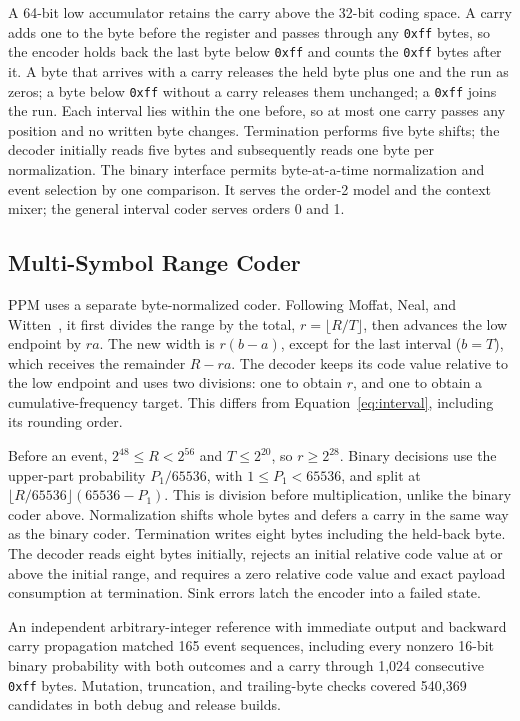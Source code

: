 \documentclass[10pt,letterpaper]{article}
\newcommand{\code}[1]{\texttt{#1}}
\begin{document}
A 64-bit low accumulator retains the carry above the 32-bit coding space. A carry adds one to the byte before the register and passes through any \code{0xff} bytes, so the encoder holds back the last byte below \code{0xff} and counts the \code{0xff} bytes after it. A byte that arrives with a carry releases the held byte plus one and the run as zeros; a byte below \code{0xff} without a carry releases them unchanged; a \code{0xff} joins the run. Each interval lies within the one before, so at most one carry passes any position and no written byte changes. Termination performs five byte shifts; the decoder initially reads five bytes and subsequently reads one byte per normalization. The binary interface permits byte-at-a-time normalization and event selection by one comparison. It serves the order-2 model and the context mixer; the general interval coder serves orders 0 and 1.

\subsection{Multi-Symbol Range Coder}
PPM uses a separate byte-normalized coder. Following Moffat, Neal, and Witten~\cite[Sec.~4.4]{moffat}, it first divides the range by the total, $r=\lfloor R/T\rfloor$, then advances the low endpoint by $ra$. The new width is $r(b-a)$, except for the last interval ($b=T$), which receives the remainder $R-ra$. The decoder keeps its code value relative to the low endpoint and uses two divisions: one to obtain $r$, and one to obtain a cumulative-frequency target. This differs from Equation~\eqref{eq:interval}, including its rounding order.

Before an event, $2^{48}\leq R<2^{56}$ and $T\leq2^{20}$, so $r\geq2^{28}$. Binary decisions use the upper-part probability $P_1/65536$, with $1\leq P_1<65536$, and split at $\lfloor R/65536\rfloor(65536-P_1)$. This is division before multiplication, unlike the binary coder above. Normalization shifts whole bytes and defers a carry in the same way as the binary coder. Termination writes eight bytes including the held-back byte. The decoder reads eight bytes initially, rejects an initial relative code value at or above the initial range, and requires a zero relative code value and exact payload consumption at termination. Sink errors latch the encoder into a failed state.

An independent arbitrary-integer reference with immediate output and backward carry propagation matched 165 event sequences, including every nonzero 16-bit binary probability with both outcomes and a carry through 1,024 consecutive \code{0xff} bytes. Mutation, truncation, and trailing-byte checks covered 540,369 candidates in both debug and release builds.
\end{document}
